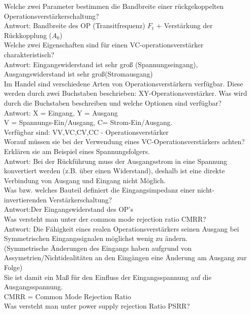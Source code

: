 \documentclass[A4]{scrreprt}
\begin{document}
  Welche zwei Parameter bestimmen die Bandbreite einer rückgekoppelten\\ 
  Operationsverstärkerschaltung?\\
  \bigskip Antwort: Bandbreite des OP (Transitfrequenz) $F_t$ + Verstärkung der Rückkopplung ($A_0$)\\
  Welche zwei Eigenschaften sind für einen VC-operationsverstärker charakteristisch?\\
  \bigskip Antwort: Eingangswiderstand ist sehr groß (Spannungseingang), Ausgangswiderstand ist sehr groß(Stromausgang)\\
  Im Handel sind verschiedene Arten von Operationsverstärkern verfügbar. Diese werden durch zwei Buchstaben beschrieben: XY-Operationsverstärker. 
  Was wird durch die Buchstaben beschreiben und welche Optionen sind verfügbar?\\
  Antwort: X = Eingang, Y = Ausgang\\
  V = Spannungs-Ein/Ausgang, C= Strom-Ein/Ausgang.\\
  \bigskip Verfügbar sind: VV,VC,CV,CC - Operationsverstärker \\
  Worauf müssen sie bei der Verwendung eines VC-Operationsverstärkers achten?\\ 
  Erklären sie am Beispiel eines Spannungsfolgers.\\  
  \bigskip Antwort: Bei der Rückführung muss der Ausgangsstrom in eine Spannung konvertiert werden (z.B. über einen Widerstand), deshalb ist eine direkte Verbindung von Ausgang und Eingang nicht Möglich.\\
  Was bzw. welches Bauteil definiert die Eingangsimpedanz einer nicht-invertierenden Verstärkerschaltung?\\
  \bigskip   Antwort:Der Eingangswiderstand des OP's\\
  Was versteht man unter der common mode rejection ratio CMRR?\\  
  Antwort: Die Fähigkeit eines realen Operationsverstärkers seinen Ausgang bei Symmetrischen Eingangssignalen möglichst wenig zu ändern.\\
  (Symmetrische Änderungen des Eingangs haben aufgrund von Assymetrien/Nichtidealitäten an den Eingängen eine Änderung am Ausgang zur Folge)\\
  \bigskip Sie ist damit ein Maß für den Einfluss der Eingangsspannung auf die Ausgangsspannung.\\
  CMRR = Common Mode Rejection Ratio\\
  Was versteht man unter power supply rejection Ratio PSRR?\\
\end{document}
